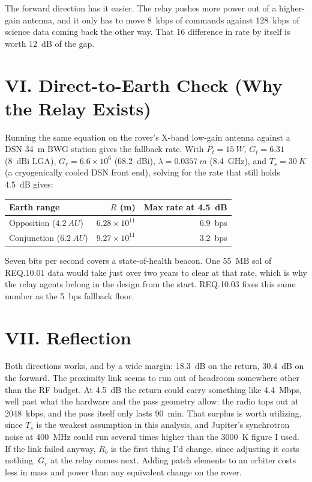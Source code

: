 \documentclass[11pt]{article}
\begin{document}
\noindent The forward direction has it easier. The relay pushes more power out of a higher-gain
antenna, and it only has to move \SI{8}{kbps} of commands against \SI{128}{kbps} of science data
coming back the other way. That \SI{16}{\times} difference in rate by itself is worth \SI{12}{dB}
of the gap.

\section*{VI. Direct-to-Earth Check (Why the Relay Exists)}

Running the same equation on the rover's X-band low-gain antenna against a DSN \SI{34}{m} BWG
station gives the fallback rate. With $P_t = \SI{15}{W}$, $G_t = 6.31$ (\SI{8}{dBi} LGA),
$G_r = 6.6\!\times\!10^6$ (\SI{68.2}{dBi}), $\lambda = \SI{0.0357}{m}$ (\SI{8.4}{GHz}), and
$T_s = \SI{30}{K}$ (a cryogenically cooled DSN front end), solving for the rate that still holds
\SI{4.5}{dB} gives:

\begin{center}
\begin{tabular}{lrr}
\toprule
Earth range & $R$ (m) & Max rate at \SI{4.5}{dB} \\
\midrule
Opposition ($\SI{4.2}{AU}$)  & $6.28\!\times\!10^{11}$ & \SI{6.9}{bps} \\
Conjunction ($\SI{6.2}{AU}$) & $9.27\!\times\!10^{11}$ & \SI{3.2}{bps} \\
\bottomrule
\end{tabular}
\end{center}

\noindent Seven bits per second covers a state-of-health beacon. One \SI{55}{MB} sol of REQ.10.01
data would take just over two years to clear at that rate, which is why the relay agents belong in
the design from the start. REQ.10.03 fixes this same number as the \SI{5}{bps} fallback floor.

\section*{VII. Reflection}

Both directions works, and by a wide margin: \SI{18.3}{dB} on the return, \SI{30.4}{dB} on the
forward. The proximity link seems to run out of headroom somewhere other than the RF budget.
At \SI{4.5}{dB} the return could carry something like \SI{4.4}{Mbps}, well past what the hardware
and the pass geometry allow: the radio tops out at \SI{2048}{kbps}, and the pass itself only lasts
\SI{90}{min}. That surplus is worth utilizing, since $T_s$ is the weakest assumption in
this analysis, and Jupiter's synchrotron noise at \SI{400}{MHz} could run several times
higher than the \SI{3000}{K} figure I used. If the link failed anyway, $R_b$ is the first thing I'd
change, since adjusting it costs nothing. $G_r$ at the relay comes next. Adding patch elements to
an orbiter costs less in mass and power than any equivalent change on the rover.
\end{document}
